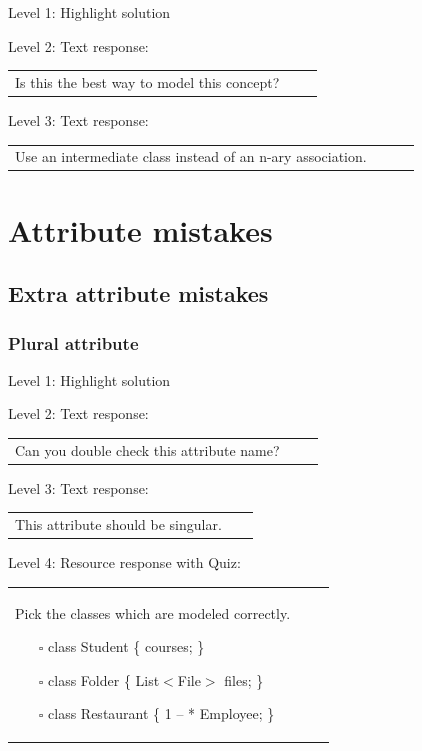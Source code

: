 \noindent Level 1: Highlight solution \medskip

\noindent Level 2: Text response: \medskip

\begin{tabular}{|p{0.9\linewidth}}
Is this the best way to model this concept?
\end{tabular} \medskip

\noindent Level 3: Text response: \medskip

\begin{tabular}{|p{0.9\linewidth}}
Use an intermediate class instead of an n-ary association.
\end{tabular} \medskip



\section{Attribute mistakes}

\subsection{Extra attribute mistakes}

\subsubsection{Plural attribute}

\noindent Level 1: Highlight solution \medskip

\noindent Level 2: Text response: \medskip

\begin{tabular}{|p{0.9\linewidth}}
Can you double check this attribute name?
\end{tabular} \medskip

\noindent Level 3: Text response: \medskip

\begin{tabular}{|p{0.9\linewidth}}
This attribute should be singular.
\end{tabular} \medskip

\noindent Level 4: Resource response with Quiz: \medskip

\begin{tabular}{|p{0.9\linewidth}}
Pick the classes which are modeled correctly.

\begin{itemize}
    \item[$\square$] class Student \{ courses; \}
    \item[$\square$] class Folder \{ List$<$File$>$ files; \}
    \item[$\square$] class Restaurant \{ 1 -- * Employee; \}
\end{itemize}

\end{tabular} \medskip


